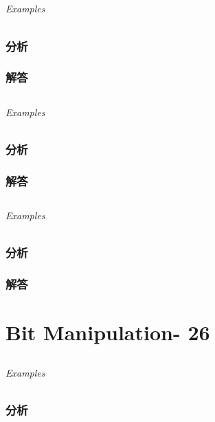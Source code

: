 \documentclass[UTF8,a4paper,12pt]{ctexbook}
\begin{document}
\section{}
	
	\subparagraph{Examples}
	
	\subsection{分析}
	
	\subsection{解答}
	
	
\section{}
	
	\subparagraph{Examples}
	
	\subsection{分析}
	
	\subsection{解答}
	
\section{}
	
	\subparagraph{Examples}
	
	\subsection{分析}
	
	\subsection{解答}
\chapter{Bit Manipulation- 26}
\section{}
	
	\subparagraph{Examples}
	
	\subsection{分析}
	
\end{document}
